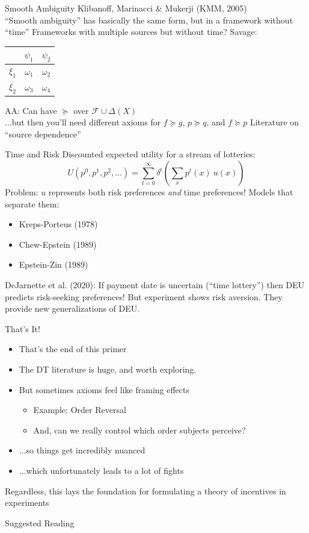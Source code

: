 \begin{frame}{Smooth Ambiguity}
Klibanoff, Marinacci \& Mukerji (KMM, 2005)\\
``Smooth ambiguity'' has basically the same form, but in a framework without ``time''
\br
Frameworks with multiple sources but without time?
\br
Savage: \hspace{0.25in}
\begin{tabular}{c|c|c|}
     & $\psi_1$ & $\psi_2$  \\
     \hline
     $\xi_1$ & $\omega_1$ & $\omega_2$ \\
     \hline
     $\xi_2$ & $\omega_3$ & $\omega_4$ \\
     \hline
\end{tabular} \hspace{0.25in} 
\br
AA: Can have $\succeq$ over $\mathcal{F}\cup \Delta(X)$\\
...but then you'll need different axioms for $f\succeq g$, $p\succeq q$, and $f\succeq p$
\br
Literature on ``source dependence''
\end{frame}

\begin{frame}{Time and Risk}
Discounted expected utility for a stream of lotteries:
$$
    U(p^0,p^1,p^2,\ldots) = \sum_{t=0}^\infty \delta^t (\sum_x p^t(x)\ u(x))
$$
Problem: $u$ represents both risk preferences \textit{and} time preferences!
\br
Models that separate them:
\begin{itemize}
    \item Kreps-Porteus (1978)
    \item Chew-Epstein (1989)
    \item Epstein-Zin (1989)
\end{itemize}
\br
DeJarnette et al. (2020): If payment date is uncertain (``time lottery'') then DEU predicts risk-seeking preferences! But experiment shows risk aversion. They provide new generalizations of DEU. 
\end{frame}

\begin{frame}{That's It!}
\begin{itemize}
    \item That's the end of this primer
    \item The DT literature is huge, and worth exploring.
    \item But sometimes axioms feel like framing effects
    \begin{itemize}
        \item Example: Order Reversal
        \item And, can we really control which order subjects perceive?
    \end{itemize}
    \item ...so things get incredibly nuanced
    \item ...which unfortunately leads to a lot of fights
\end{itemize}
\br
Regardless, this lays the foundation for formulating a theory of incentives in experiments
    
\end{frame}


\nocite{}

\begin{frame}[allowframebreaks]{Suggested Reading}
    
\end{frame}


